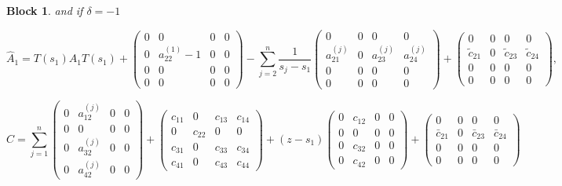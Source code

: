 \documentclass[12pt]{article}
\newtheorem{block}{Block}
\begin{document}
\begin{block}
and if $\delta = -1$

\[
    \hat{A}_1 = T(s_1) A_1 T(s_1)
    +\begin{pmatrix}
        0 & 0 & 0 & 0 \\[10pt]
        0 & a_{22}^{(1)} - 1 & 0 & 0\\[10pt]
        0 & 0 & 0 & 0 \\[10pt]
        0 & 0 & 0 & 0
    \end{pmatrix}
    -\sum_{j=2}^{n} \frac{1}{s_j-s_1}\begin{pmatrix}
        0 & 0 & 0 & 0 \\[10pt]
        a_{21}^{(j)} & 0 & a_{23}^{(j)}  & a_{24}^{(j)}\\[10pt]
        0 & 0 & 0 & 0 \\[10pt]
        0 & 0 & 0 & 0
    \end{pmatrix}
    + \begin{pmatrix}
        0 & 0 & 0 & 0 \\[10pt]
        \tilde{c}_{21} & 0 & \tilde{c}_{23} & \tilde{c}_{24} \\[10pt]
        0 & 0 & 0 & 0 \\[10pt]
        0 & 0 & 0 & 0
    \end{pmatrix},
\]

\[
    \hat{C} = \sum_{j=1}^{n} \begin{pmatrix}
        0 & a_{12}^{(j)} & 0 & 0 \\[10pt]
        0 & 0 & 0 & 0 \\[10pt]
        0 & a_{32}^{(j)} & 0 & 0 \\[10pt]
        0 & a_{42}^{(j)} & 0 & 0
    \end{pmatrix}
    +\begin{pmatrix}
        c_{11} & 0 & c_{13} & c_{14} \\[10pt]
        0 & c_{22} & 0 & 0 \\[10pt]
        c_{31} & 0 & c_{33} & c_{34} \\[10pt]
        c_{41} & 0 & c_{43} & c_{44}
    \end{pmatrix}
    + (z-s_1) \begin{pmatrix}
        0 & c_{12}  & 0 & 0 \\[10pt]
        0 & 0 & 0 & 0 \\[10pt]
        0 & c_{32} & 0 & 0 \\[10pt]
        0 & c_{42} & 0 & 0
    \end{pmatrix}
    +\begin{pmatrix}
        0 & 0 & 0 & 0 \\[10pt]
        \bar{c}_{21} & 0 & \bar{c}_{23} & \bar{c}_{24} \\[10pt]
        0 & 0 & 0 & 0 \\[10pt]
        0 & 0 & 0 & 0
    \end{pmatrix}
\]



\end{block}
\end{document}
